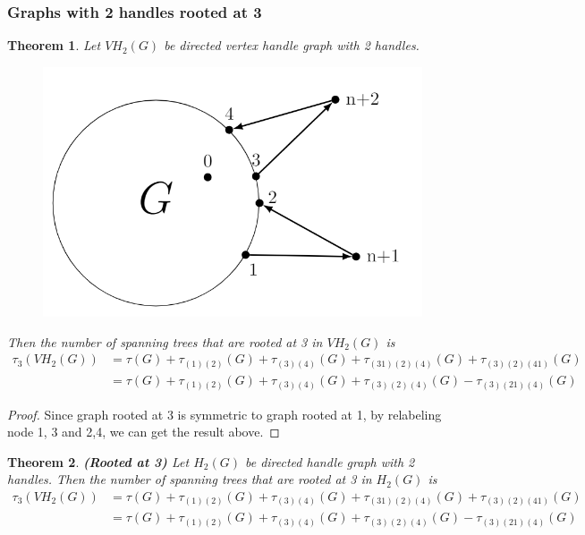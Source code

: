 \documentclass[twoside,11pt]{article}
\newtheorem{theorem}{Theorem}[section]
\numberwithin{equation}{section} \DeclareMathOperator{\Var}{Var}
\newcommand{\bpf}{\begin{proof}}
\newcommand{\epf}{\end{proof}}
\newcommand{\bthm}{\begin{theorem}}
\newcommand{\ethm}{\end{theorem}}
\begin{document}
\subsubsection{Graphs with 2 handles rooted at 3}
\bthm
Let $VH_2(G)$ be directed vertex handle graph with 2 handles. 
\begin{figure}[H]
    \centering
    \includegraphics[scale=0.4]{tik_2handles.PNG}
\end{figure}
Then the number of spanning trees that are rooted at 3 in $VH_2(G)$ is
\begin{equation*}
    \begin{split}
        \tau_3(VH_2(G)) &= \tau(G)+\tau_{(1)(2)}(G)+\tau_{(3)(4)}(G)+
 \tau_{(31)(2)(4)}(G)+\tau_{(3)(2)(41)}(G)  \\
 &= \tau(G)+\tau_{(1)(2)}(G)+\tau_{(3)(4)}(G)+
 \tau_{(3)(2)(4)}(G)-\tau_{(3)(21)(4)}(G)
    \end{split}
\end{equation*}
\ethm
\bpf
Since graph rooted at 3 is symmetric to graph rooted at 1, by relabeling node 1, 3 and 2,4, we can get the result above.
\epf


\bthm\label{DH rooted 3} 
{\bf (Rooted at 3)}
Let $H_2(G)$ be directed handle graph with 2 handles. Then the number of spanning trees that are rooted at 3 in $H_2(G)$ is
\begin{equation*}
    \begin{split}
        \tau_3(VH_2(G)) &= \tau(G)+\tau_{(1)(2)}(G)+\tau_{(3)(4)}(G)+
 \tau_{(31)(2)(4)}(G)+\tau_{(3)(2)(41)}(G)  \\
 &= \tau(G)+\tau_{(1)(2)}(G)+\tau_{(3)(4)}(G)+
 \tau_{(3)(2)(4)}(G)-\tau_{(3)(21)(4)}(G)
    \end{split}
\end{equation*}
\ethm
\end{document}
